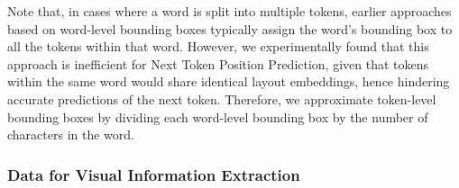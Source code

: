 Note that, in cases where a word is split into multiple tokens, earlier approaches based on word-level bounding boxes typically assign the word's bounding box to all the tokens within that word. However, we experimentally found that this approach is inefficient for Next Token Position Prediction, given that tokens within the same word would share identical layout embeddings, hence hindering accurate predictions of the next token. Therefore, we approximate token-level bounding boxes by dividing each word-level bounding box by the number of characters in the word. 

\subsubsection{Data for Visual Information Extraction}

